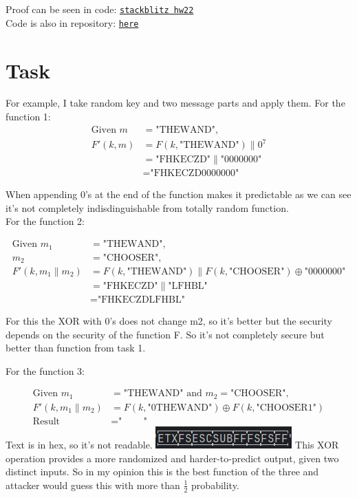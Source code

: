 \documentclass{article}
\begin{document}
Proof can be seen in code: \href{https://stackblitz.com/edit/js-ekqepc?devtoolsheight=80&file=hw22.js&hideDevTools=false}{\texttt{stackblitz hw22}}\\
Code is also in repository: \href{https://github.com/Nurech/js-ekqepc}{\texttt{here}}

\section{Task}%

For example, I take random key and two message parts and apply them.
For the function 1:
\begin{align*}
  \text{Given } m &= \text{"THEWAND"}, \\
  F'(k, m) &= F(k, \text{"THEWAND"}) \parallel 0^7 \\
  &= \text{"FHKECZD"} \parallel \text{"0000000"} \\
  &= \text{"FHKECZD0000000"}
\end{align*}

When appending 0's at the end of the function makes it predictable as we can see it's not completely indisdinguishable from totally
random function.\\

For the function 2:

\begin{align*}
  \text{Given } m_1 &= \text{"THEWAND"}, \\
  m_2 &= \text{"CHOOSER"}, \\
  F'(k, m_1 \parallel m_2) &= F(k, \text{"THEWAND"}) \parallel F(k, \text{"CHOOSER"}) \oplus \text{"0000000"} \\
  &= \text{"FHKECZD"} \parallel \text{"LFHBL"} \\
  &= \text{"FHKECZDLFHBL"}
\end{align*}

For this the XOR with 0's does not change m2, so it's better but the security depends on the security of the function F.
So it's not completely secure but better than function from task 1.

For the function 3:

\begin{align*}
  \text{Given } m_1 &= \text{"THEWAND"} \text{ and } m_2 = \text{"CHOOSER"}, \\
  F'(k, m_1 \parallel m_2) &= F(k, \text{"0THEWAND"}) \oplus F(k, \text{"CHOOSER1"}) \\
  \text{Result} &= \text{""}
\end{align*}
Text is in hex, so it's not readable. \includegraphics{img}
This XOR operation provides a more randomized and harder-to-predict output, given two distinct inputs.
So in my opinion this is the best function of the three and attacker would guess this with more than $\frac{1}{2}$  probability.\\
\end{document}
